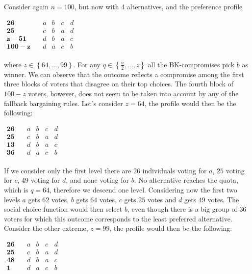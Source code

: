 \documentclass[version=3.21, pagesize, notitlepage, twoside=off, bibliography=totoc, DIV=calc, fontsize=12pt, a4paper]{scrartcl}
\begin{document}
\begin{example}
	\label{ex:exk}
	Consider again $n=100$, but now with 4 alternatives, and the preference profile
	\begin{center}
		$
		\begin{array}{ccccc}
		\mathbf{26} \quad &a&b&c&d\\
		\mathbf{25} \quad &c&b&a&d\\
		\mathbf{z-51} \quad &d&b&a&c\\
		\mathbf{100-z} \quad &d&a&c&b\\
		\end{array}
		$
	\end{center}
where $z\in \left\{ 64,..., 99\right\}$. For any $q\in \left\{ \frac{n}{2},..., z\right\}$ all the BK-compromises pick $b$ as winner. We can observe that the outcome reflects a compromise among the first three blocks of voters that disagree on their top choices. The fourth block of $100-z$ voters, however, does not seem to be taken into account by any of the fallback bargaining rules. 
Let's consider $z=64$, the profile would then be the following: 

\begin{center}
	$
	\begin{array}{ccccc}
	\mathbf{26} \quad &a&b&c&d\\
	\mathbf{25} \quad &c&b&a&d\\
	\mathbf{13} \quad &d&b&a&c\\
	\mathbf{36} \quad &d&a&c&b\\
	\end{array}
	$
\end{center}

If we consider only the first level there are $26$ individuals voting for $a$, $25$ voting for $c$, $49$ voting for $d$, and none voting for $b$. No alternative reaches the quota, which is $q=64$, therefore we descend one level. Considering now the first two levels $a$ gets $62$ votes, $b$ gets $64$ votes, $c$ gets $25$ votes and $d$ gets $49$ votes. The social choice function would then select $b$, even though there is a big group of $36$ voters for which this outcome corresponds to the least preferred alternative.
Consider the other extreme, $z=99$, the profile would then be the following: 

\begin{center}
	$
	\begin{array}{ccccc}
	\mathbf{26} \quad &a&b&c&d\\
	\mathbf{25} \quad &c&b&a&d\\
	\mathbf{48} \quad &d&b&a&c\\
	\mathbf{1} \quad &d&a&c&b\\
	\end{array}
	$
\end{center} 


\end{example}
\end{document}
